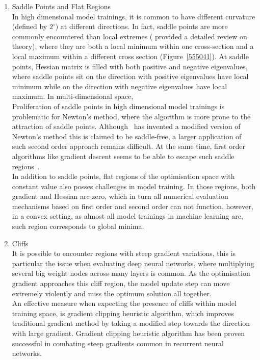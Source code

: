 \begin{enumerate}
    \item Saddle Points and Flat Regions\\
In high dimensional model trainings, it is common to have different curvature (defined by $2^\circ$) at different directions. In fact, saddle points are more commonly encountered than local extremes (\citet{DauphinPGCGB14} provided a detailed review on theory), where they are both a local minimum within one cross-section and a local maximum within a different cross section (Figure~\ref{555041}). At saddle points, Hessian matrix is filled with both positive and negative eigenvalues, where saddle points sit on the direction with positive eigenvalues have local minimum while on the direction with negative eigenvalues have local maximum. In multi-dimensional space,  \\
Proliferation of saddle points in high dimensional model trainings is problematic for Newton's method, where the algorithm is more prone to the attraction of saddle points. Although~\citet{DauphinPGCGB14} has invented a modified version of Newton's method this is claimed to be saddle-free, a larger application of such second order approach remains difficult. At the same time, first order algorithms like gradient descent seems to be able to escape such saddle regions~\cite{GoodfellowV14}.\\
In addition to saddle points, flat regions of the optimisation space with constant value also posses challenges in model training. In those regions, both gradient and Hessian are zero, which in turn all numerical evaluation mechanisms based on first order and second order can not function, however, in a convex setting, as almost all model trainings in machine learning are, such region corresponds to global minima. 
    \item Cliffs \\
It is possible to encounter regions with steep gradient variations, this is particular the issue when evaluating deep neural networks, where multiplying several big weight nodes across many layers is common. As the optimisation gradient approaches this cliff region, the model update step can move extremely violently and miss the optimum solution all together. \\
An effective measure when expecting the presence of cliffs within model training space, is gradient clipping heuristic algorithm, which improves traditional gradient method by taking a modified step towards the direction with large gradient. Gradient clipping heuristic algorithm has been proven successful in combating steep gradients common in recurrent neural networks.~\cite{Pascanu2012UnderstandingTE} 

\end{enumerate}
